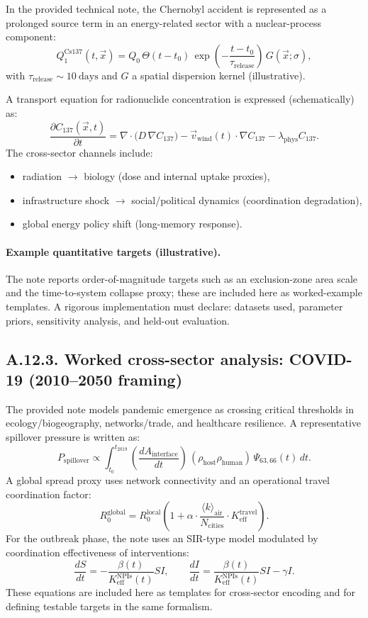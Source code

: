 \documentclass[13pt,a4paper]{article}
\begin{document}
	In the provided technical note, the Chernobyl accident is represented as a prolonged source term in an energy-related sector with a nuclear-process component:
	$$
	Q_{1}^{\mathrm{Cs137}}(t,\vec{x}) = Q_0\,\Theta(t-t_0)\,\exp\!\left(-\frac{t-t_0}{\tau_{\mathrm{release}}}\right)\,G(\vec{x};\sigma),
	$$
	with $\tau_{\mathrm{release}}\sim 10\ \mathrm{days}$ and $G$ a spatial dispersion kernel (illustrative).
	
	A transport equation for radionuclide concentration is expressed (schematically) as:
	$$
	\frac{\partial C_{137}(\vec{x},t)}{\partial t}
	= \nabla\cdot\big(D\,\nabla C_{137}\big) - \vec{v}_{\mathrm{wind}}(t)\cdot\nabla C_{137} - \lambda_{\mathrm{phys}} C_{137}.
	$$
	The cross-sector channels include:
	\begin{itemize}[leftmargin=*]
		\item radiation $\to$ biology (dose and internal uptake proxies),
		\item infrastructure shock $\to$ social/political dynamics (coordination degradation),
		\item global energy policy shift (long-memory response).
	\end{itemize}
	
	\paragraph{Example quantitative targets (illustrative).}
	The note reports order-of-magnitude targets such as an exclusion-zone area scale and the time-to-system collapse proxy; these are included here as worked-example templates. A rigorous implementation must declare: datasets used, parameter priors, sensitivity analysis, and held-out evaluation.
	
	\subsection*{A.12.3. Worked cross-sector analysis: COVID-19 (2010--2050 framing)}
	
	The provided note models pandemic emergence as crossing critical thresholds in ecology/biogeography, networks/trade, and healthcare resilience. A representative spillover pressure is written as:
	$$
	P_{\mathrm{spillover}} \propto \int_{t_0}^{t_{2019}}
	\left(\frac{dA_{\mathrm{interface}}}{dt}\right)\,
	\left(\rho_{\mathrm{host}}\rho_{\mathrm{human}}\right)\,
	\Psi_{63,66}(t)\,dt.
	$$
	A global spread proxy uses network connectivity and an operational travel coordination factor:
	$$
	R_0^{\mathrm{global}} = R_0^{\mathrm{local}}\left(1+\alpha\cdot \frac{\langle k\rangle_{\mathrm{air}}}{N_{\mathrm{cities}}}\cdot K_{\mathrm{eff}}^{\mathrm{travel}}\right).
	$$
	For the outbreak phase, the note uses an SIR-type model modulated by coordination effectiveness of interventions:
	$$
	\frac{dS}{dt} = - \frac{\beta(t)}{K_{\mathrm{eff}}^{\mathrm{NPIs}}(t)}SI,\qquad
	\frac{dI}{dt} = \frac{\beta(t)}{K_{\mathrm{eff}}^{\mathrm{NPIs}}(t)}SI - \gamma I.
	$$
	These equations are included here as templates for cross-sector encoding and for defining testable targets in the same formalism.
	
\end{document}

